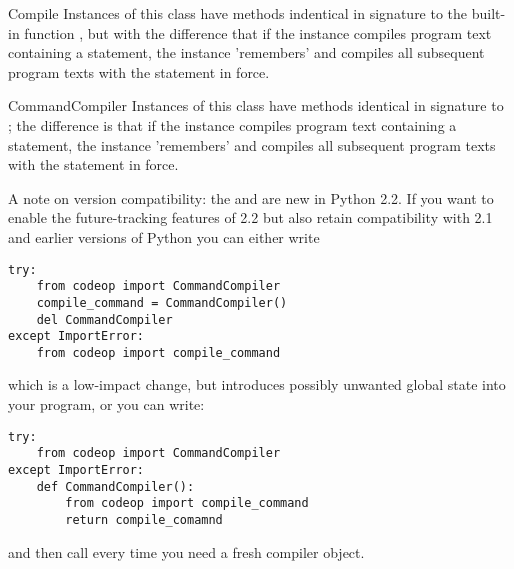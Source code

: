 \begin{classdesc}{Compile}{}
Instances of this class have  methods indentical in
signature to the built-in function , but with the
difference that if the instance compiles program text containing a
 statement, the instance 'remembers' and compiles
all subsequent program texts with the statement in force.
\end{classdesc}

\begin{classdesc}{CommandCompiler}{}
Instances of this class have  methods identical in
signature to ; the difference is that if
the instance compiles program text containing a 
statement, the instance 'remembers' and compiles all subsequent
program texts with the statement in force.
\end{classdesc}

A note on version compatibility: the  and
 are new in Python 2.2.  If you want to enable
the future-tracking features of 2.2 but also retain compatibility with
2.1 and earlier versions of Python you can either write

\begin{verbatim}
try:
    from codeop import CommandCompiler
    compile_command = CommandCompiler()
    del CommandCompiler
except ImportError:
    from codeop import compile_command
\end{verbatim}

which is a low-impact change, but introduces possibly unwanted global
state into your program, or you can write:

\begin{verbatim}
try:
    from codeop import CommandCompiler
except ImportError:
    def CommandCompiler():
        from codeop import compile_command
        return compile_comamnd
\end{verbatim}

and then call  every time you need a fresh
compiler object.
